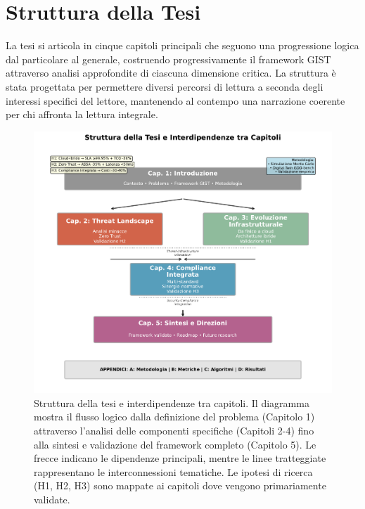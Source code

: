 \section{Struttura della Tesi}

La tesi si articola in cinque capitoli principali che seguono una progressione logica dal particolare al generale, costruendo progressivamente il framework GIST attraverso analisi approfondite di ciascuna dimensione critica. La struttura è stata progettata per permettere diversi percorsi di lettura a seconda degli interessi specifici del lettore, mantenendo al contempo una narrazione coerente per chi affronta la lettura integrale.

\begin{figure}[htbp]
\centering
\includegraphics[width=1\textwidth]{thesis_figures/cap1/fig_1_4_thesis_structure.pdf}
\caption{Struttura della tesi e interdipendenze tra capitoli. Il diagramma mostra il flusso logico dalla definizione del problema (Capitolo 1) attraverso l'analisi delle componenti specifiche (Capitoli 2-4) fino alla sintesi e validazione del framework completo (Capitolo 5). Le frecce indicano le dipendenze principali, mentre le linee tratteggiate rappresentano le interconnessioni tematiche. Le ipotesi di ricerca (H1, H2, H3) sono mappate ai capitoli dove vengono primariamente validate.}
\label{fig:thesis_structure}
\end{figure}

